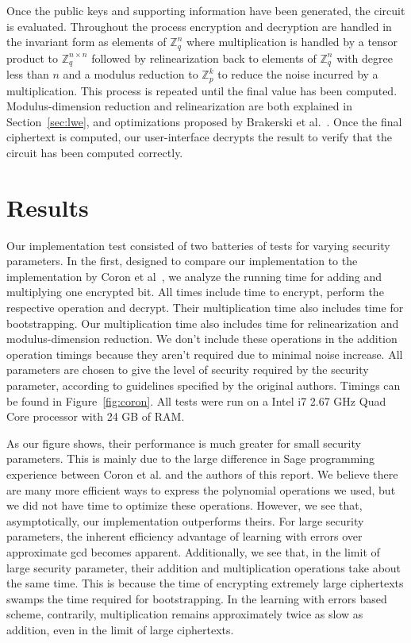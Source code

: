 \documentclass[letterpaper,twocolumn,10pt]{article}
\begin{document}
Once the public keys and supporting information have been generated, the circuit is evaluated. Throughout the process encryption and decryption are handled in the invariant form as elements of $\mathbb{Z}^n_q$ where multiplication is handled by a tensor product to $\mathbb{Z}^{n\times n}_q$ followed by relinearization back to elements of $\mathbb{Z}^n_q$ with degree less than $n$ and a modulus reduction to $\mathbb{Z}^k_p$ to reduce the noise incurred by a multiplication. This process is repeated until the final value has been computed. Modulus-dimension reduction and relinearization are both explained in Section~\ref{sec:lwe}, and optimizations proposed by Brakerski et al.~\cite{StandardLWE}. Once the final ciphertext is computed, our user-interface decrypts the result to verify that the circuit has been computed correctly.


\section{Results}
\label{sec:results}
Our implementation test consisted of two batteries of tests for varying security parameters. In the first, designed to compare our implementation to the implementation by Coron et al~\cite{CNT}, we analyze the running time for adding and multiplying one encrypted bit. All times include time to encrypt, perform the respective operation and decrypt. Their multiplication time also includes time for bootstrapping. Our multiplication time also includes time for relinearization and modulus-dimension reduction. We don't include these operations in the addition operation timings because they aren't required due to minimal noise increase. All parameters are chosen to give the level of security required by the security parameter, according to guidelines specified by the original authors. Timings can be found in Figure~\ref{fig:coron}. All tests were run on a Intel i7 2.67 GHz Quad Core processor with 24 GB of RAM.

As our figure shows, their performance is much greater for small security parameters. This is mainly due to the large difference in Sage programming experience between Coron et al. and the authors of this report. We believe there are many more efficient ways to express the polynomial operations we used, but we did not have time to optimize these operations. However, we see that, asymptotically, our implementation outperforms theirs. For large security parameters, the inherent efficiency advantage of learning with errors over approximate gcd becomes apparent. Additionally, we see that, in the limit of large security parameter, their addition and multiplication operations take about the same time. This is because the time of encrypting extremely large ciphertexts swamps the time required for bootstrapping. In the learning with errors based scheme, contrarily, multiplication remains approximately twice as slow as addition, even in the limit of large ciphertexts.
\end{document}
